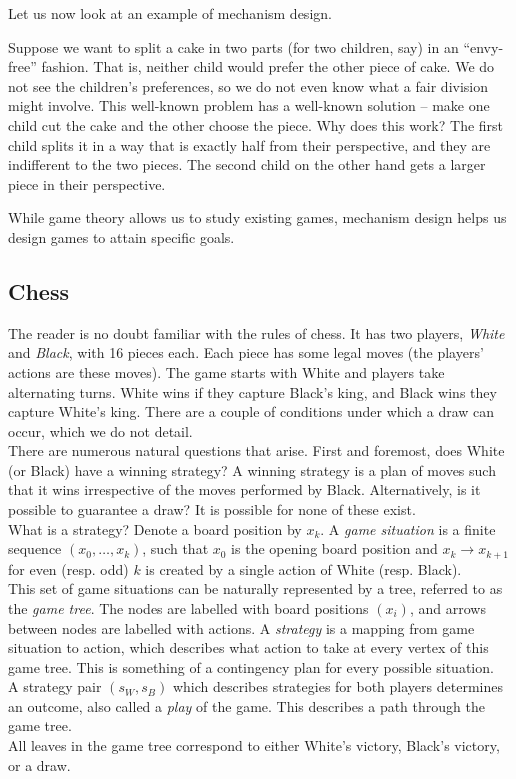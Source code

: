 Let us now look at an example of mechanism design.

\begin{fex}
	Suppose we want to split a cake in two parts (for two children, say) in an ``envy-free'' fashion. That is, neither child would prefer the other piece of cake. We do not see the children's preferences, so we do not even know what a fair division might involve. This well-known problem has a well-known solution -- make one child cut the cake and the other choose the piece. Why does this work? The first child splits it in a way that is exactly half from their perspective, and they are indifferent to the two pieces. The second child on the other hand gets a larger piece in their perspective.
\end{fex}

While game theory allows us to study existing games, mechanism design helps us design games to attain specific goals.

\subsection{Chess}

	The reader is no doubt familiar with the rules of chess. It has two players, \emph{White} and \emph{Black}, with 16 pieces each. Each piece has some legal moves (the players' actions are these moves). The game starts with White and players take alternating turns. White wins if they capture Black's king, and Black wins they capture White's king. There are a couple of conditions under which a draw can occur, which we do not detail.\\
	There are numerous natural questions that arise.
	First and foremost, does White (or Black) have a winning strategy? A winning strategy is a plan of moves such that it wins irrespective of the moves performed by Black. Alternatively, is it possible to guarantee a draw? It is possible for none of these exist.\\

	What is a strategy? Denote a board position by $x_k$. A \emph{game situation} is a finite sequence $(x_0,\ldots,x_k)$, such that
	$x_0$ is the opening board position and $x_k \to x_{k+1}$ for even (resp. odd) $k$ is created by a single action of White (resp. Black).\\
	This set of game situations can be naturally represented by a tree, referred to as the \emph{game tree}. The nodes are labelled with board positions $(x_i)$, and arrows between nodes are labelled with actions. A \emph{strategy} is a mapping from game situation to action, which describes what action to take at every vertex of this game tree. This is something of a contingency plan for every possible situation.\\
	A strategy pair $(s_W, s_B)$ which describes strategies for both players determines an outcome, also called a \emph{play} of the game. This describes a path through the game tree.\\
	All leaves in the game tree correspond to either White's victory, Black's victory, or a draw.\\


